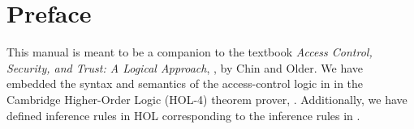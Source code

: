 \chapter*{Preface}

This manual is meant to be a companion to the textbook \emph{Access
  Control, Security, and Trust: A Logical Approach}, \cite{ACST}, by
Chin and Older. We have embedded the syntax and semantics of the
access-control logic in \cite{ACST} in the Cambridge Higher-Order
Logic (HOL-4) theorem prover, \cite{HOL}. Additionally, we have
defined inference rules in HOL corresponding to the inference rules in
\cite{ACST}.




